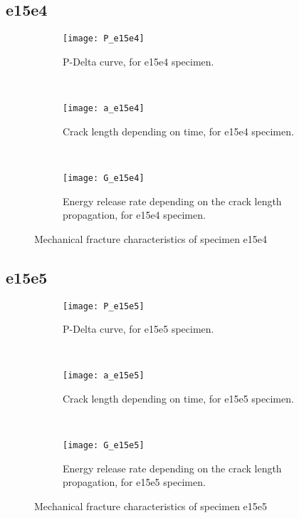 \subsection{e15e4}

\begin{figure}[H]
	\centering
	\begin{subfigure}{0.48\linewidth}
		\centering
		\texttt{[image: P\_e15e4]}
		\decoRule
		\caption{P-Delta curve, for e15e4 specimen.}
		\label{fig:P_e15e3}
	\end{subfigure}
	\hfill \\
	\begin{subfigure}{0.48\linewidth}
		\centering
		\texttt{[image: a\_e15e4]}
		\decoRule
		\caption{Crack length depending on time, for e15e4 specimen.}
		\label{fig:a_e15e4}
	\end{subfigure}
	\hfill\\
	\begin{subfigure}{0.48\linewidth}
		\centering
		\texttt{[image: G\_e15e4]}
		\decoRule
		\caption{Energy release rate depending on the crack length propagation, for e15e4 specimen.}
		\label{fig:G_e15e4}
	\end{subfigure}
	\caption{Mechanical fracture characteristics of specimen e15e4}
	\label{E1o_a}
\end{figure}

\subsection{e15e5}

\begin{figure}[H]
	\centering
	\begin{subfigure}{0.48\linewidth}
		\centering
		\texttt{[image: P\_e15e5]}
		\decoRule
		\caption{P-Delta curve, for e15e5 specimen.}
		\label{fig:P_e15e5}
	\end{subfigure}
	\hfill \\
	\begin{subfigure}{0.48\linewidth}
		\centering
		\texttt{[image: a\_e15e5]}
		\decoRule
		\caption{Crack length depending on time, for e15e5 specimen.}
		\label{fig:a_e15e5}
	\end{subfigure}
	\hfill\\
	\begin{subfigure}{0.48\linewidth}
		\centering
		\texttt{[image: G\_e15e5]}
		\decoRule
		\caption{Energy release rate depending on the crack length propagation, for e15e5 specimen.}
		\label{fig:G_e15e5}
	\end{subfigure}
	\caption{Mechanical fracture characteristics of specimen e15e5}
	\label{E1o_a}
\end{figure}



